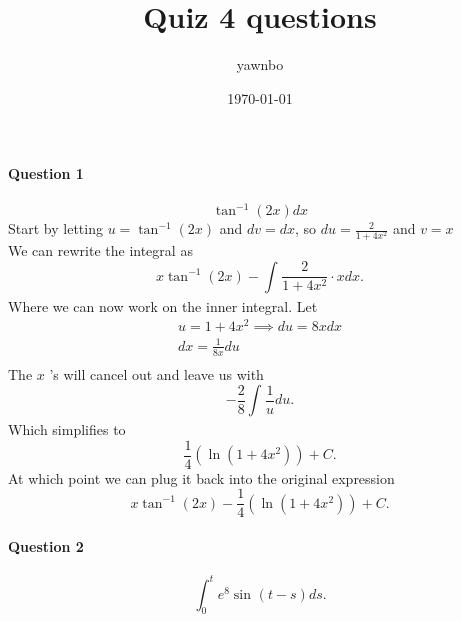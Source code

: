 \documentclass[a4paper]{article}
\title{Quiz 4 questions}
\author{yawnbo}
\date{\today}
\begin{document}
\paragraph{Question 1}
\[
  \tan^{-1}(2x)dx
\]
Start by letting $u=\tan^{-1}(2x)$ and $dv=dx$, so $du=\frac{2}{1+4x^2}$ and $v=x$ \\
We can rewrite the integral as
\[
x\tan^{-1}(2x)-\int_{}^{} \frac{2}{1+4x^2}\cdot xdx
.\]
Where we can now work on the inner integral. Let
\begin{gather*}
  u=1+4x^2 \implies du=8xdx \\
  dx= \frac{1}{8x}du\\
\end{gather*}
The $x$ 's will cancel out and leave us with
\[
-\frac{2}{8}\int_{}^{} \frac{1}{u}du 
.\] 
Which simplifies to
\[
\frac{1}{4}(\ln(1+4x^2))+C
.\] 
At which point we can plug it back into the original expression
\[
x\tan^{-1}(2x)-\frac{1}{4}(\ln(1+4x^2))+C
.\]
\newpage
\paragraph{Question 2}
\[
\int_{0}^{t} e^{8} \sin^{}(t-s)ds
.\]
\end{document}
